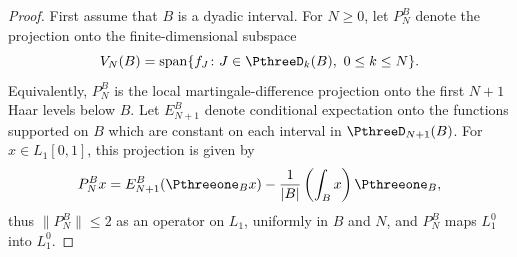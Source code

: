 \documentclass[11pt,reqno]{amsart}
\makeatletter
\theoremstyle{plain}
\theoremstyle{definition}
\newcounter{problempaper}
\newenvironment{problempaperbody}{%
  \setcounter{subsection}{0}%
  \setcounter{subsubsection}{0}%
  \setcounter{paragraph}{0}%
  \renewcommand{\thesubsection}{\arabic{subsection}}%
  \renewcommand{\thesubsubsection}{\thesubsection.\arabic{subsubsection}}%
  \renewcommand{\theparagraph}{\thesubsubsection.\arabic{paragraph}}%
  \let\problem@outersection\section
  \let\problem@outersubsection\subsection
  \let\problem@outersubsubsection\subsubsection
  \let\problem@outerparagraph\paragraph
  \let\section\problem@papersection
  \let\subsection\problem@papersubsection
  \let\subsubsection\problem@papersubsubsection
}{%
  \let\section\problem@outersection
  \let\subsection\problem@outersubsection
  \let\subsubsection\problem@outersubsubsection
  \let\paragraph\problem@outerparagraph
}
\newcommand{\problem@target}[2]{%
  \hypertarget{problem-\theproblempaper-#1-#2}{}%
}
\newcommand{\problem@paperheading}[3]{%
  \par\bigskip
  \problem@target{#1}{#2}%
  \noindent{\large\bfseries #2.\quad #3\par}%
  \nobreak\smallskip
}
\newcommand{\problem@papersubheading}[3]{%
  \par\medskip
  \problem@target{#1}{#2}%
  \noindent{\normalsize\bfseries #2.\quad #3\par}%
  \nobreak\smallskip
}
\newcommand{\problem@papersubsubheading}[3]{%
  \par\smallskip
  \problem@target{#1}{#2}%
  \noindent{\normalsize\itshape #2.\quad #3.\ }%
}
\def\problem@papersection{%
  \@ifstar{\problem@papersectionstar}{\problem@papersectionnostar}%
}
\def\problem@papersectionstar#1{%
  \par\bigskip\noindent{\large\bfseries #1\par}\nobreak\smallskip
}
\def\problem@papersectionnostar#1{%
  \refstepcounter{subsection}%
  \setcounter{subsubsection}{0}%
  \setcounter{paragraph}{0}%
  \problem@paperheading{section}{\thesubsection}{#1}%
  \problem@writecontentsline{section}{\thesubsection}{#1}%
}
\def\problem@papersubsection{%
  \@ifstar{\problem@papersubsectionstar}{\problem@papersubsectionnostar}%
}
\def\problem@papersubsectionstar#1{%
  \par\medskip\noindent{\normalsize\bfseries #1\par}\nobreak\smallskip
}
\def\problem@papersubsectionnostar#1{%
  \refstepcounter{subsubsection}%
  \setcounter{paragraph}{0}%
  \problem@papersubheading{subsection}{\thesubsubsection}{#1}%
  \problem@writecontentsline{subsection}{\thesubsubsection}{#1}%
}
\def\problem@papersubsubsection{%
  \@ifstar{\problem@papersubsubsectionstar}{\problem@papersubsubsectionnostar}%
}
\def\problem@papersubsubsectionstar#1{%
  \par\smallskip\noindent{\normalsize\itshape #1.\ }%
}
\def\problem@papersubsubsectionnostar#1{%
  \refstepcounter{paragraph}%
  \problem@papersubsubheading{subsubsection}{\theparagraph}{#1}%
  \problem@writecontentsline{subsubsection}{\theparagraph}{#1}%
}
\newcommand{\problem@writecontentsline}[3]{%
  \begingroup
  \protected@write\@auxout{}{%
    \string\problemcontentsentry{\theproblempaper}{#1}{#2}{#3}{\thepage}%
  }%
  \endgroup
}
\newcommand{\problemcontentsentry}[5]{%
  \@ifundefined{problemcontents@#1}{%
    \expandafter\gdef\csname problemcontents@#1\endcsname{}%
  }{}%
  \expandafter\g@addto@macro\csname problemcontents@#1\endcsname{%
    \problemcontentsline{#1}{#2}{#3}{#4}{#5}%
  }%
}
\newcommand{\problemcontentslink}[4]{%
  \hyperlink{problem-#1-#2-#3}{#4}%
}
\newcommand{\problemcontentsline}[5]{%
  \ifstrequal{#2}{section}{%
    \par\noindent
    \problemcontentslink{#1}{#2}{#3}{\makebox[2.5em][l]{#3}#4}%
    \nobreak\dotfill
    \problemcontentslink{#1}{#2}{#3}{#5}\par
  }{%
    \ifstrequal{#2}{subsection}{%
      \par\noindent\hspace*{1.5em}%
      \problemcontentslink{#1}{#2}{#3}{\makebox[3.5em][l]{#3}#4}%
      \nobreak\dotfill
      \problemcontentslink{#1}{#2}{#3}{#5}\par
    }{%
      \par\noindent\hspace*{3em}%
      \problemcontentslink{#1}{#2}{#3}{\makebox[4.5em][l]{#3}#4}%
      \nobreak\dotfill
      \problemcontentslink{#1}{#2}{#3}{#5}\par
    }%
  }%
}
\makeatother
\begin{document}
\begin{problempaperbody}
\begin{proof}
First assume that $B$ is a dyadic interval. For $N\geq 0$, let $P_N^B$ denote the projection onto the finite-dimensional subspace
\begin{equation*}
         V_N(B) = \operatorname{span}\{f_J\colon J\in\PthreeD_k(B),\ 0\leq k\leq N\}.
\end{equation*}
Equivalently, $P_N^B$ is the local martingale-difference projection onto the first $N+1$ Haar levels below $B$. Let $E_{N+1}^B$ denote conditional expectation onto the functions supported on $B$ which are constant on each interval in $\PthreeD_{N+1}(B)$. For $x\in L_1[0,1]$, this projection is given by
\begin{equation*}
        P_N^Bx=E_{N+1}^B(\Pthreeone_Bx)-\frac1{|B|}\left(\int_Bx\right)\Pthreeone_B,
\end{equation*}
thus $\|P_N^B\|\leq 2$ as an operator on $L_1$, uniformly in $B$ and $N$, and $P_N^B$ maps $L_1^0$ into $L_1^0$.
 

\end{proof}
\end{problempaperbody}
\end{document}
